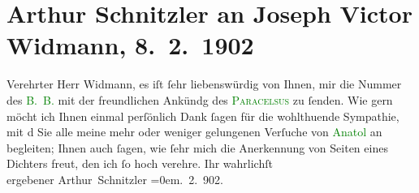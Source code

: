 

               \section[Arthur Schnitzler an Joseph Victor Widmann, 8. 2. 1902]{ Arthur Schnitzler an Joseph Victor Widmann,
                    8. 2. 1902}\nopagebreak{}\rehead{ }\normalsize\beginnumbering{} \toendnotes[C]{\smallbreak\pagebreak[2]} 
\pstart{}{\pb}Verehrter Herr
                        Widmann,\pend\pstart
            es iſt ſehr liebenswürdig von Ihnen, mir die Nummer des \textcolor{green}{B. B.}{}\ledrightnote{\textcolor{green}{Der Bund}} mit der freundlichen Ankündg des \textcolor{green}{\textsc{Paracelsus}}{}\ledrightnote{\textcolor{green}{Paracelsus. Versspiel in einem Akt}} zu ſenden. Wie gern
                    möcht ich Ihnen einmal perſönlich Dank ſagen für die {\pb}wohlthuende Sympathie, mit d
               Sie
                    alle meine mehr oder weniger gelungenen Verſuche von \textcolor{green}{Anatol}{}\ledrightnote{\textcolor{green}{Anatol}} an begleiten; Ihnen auch ſagen, wie ſehr mich die
                    Anerkennung von Seiten eines Dichters freut, den ich ſo hoch verehre.\pend
           \pstart
           Ihr wahrlichſt{\\[\baselineskip]}ergebener \spacefill\mbox{Arthur
                    Schnitzler}\pend
           \leftskip=0em{}. 2. 902.\pend
           \endnumbering{}  
      